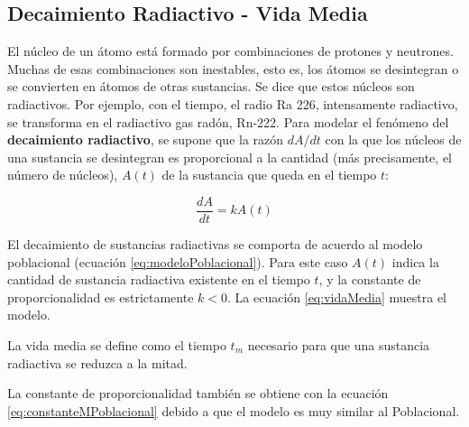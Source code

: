 \subsection{Decaimiento Radiactivo - Vida Media}

El núcleo de un átomo está formado por combinaciones de protones y neutrones. Muchas de esas combinaciones son inestables, esto es, los 
átomos se desintegran o se convierten en átomos de otras sustancias. Se dice que estos núcleos son radiactivos. Por ejemplo, con el tiempo, 
el radio Ra 226, intensamente radiactivo, se transforma en el radiactivo gas radón, Rn-222. Para modelar el fenómeno del \textbf{decaimiento 
radiactivo}, se supone que la razón $dA/dt$ con la que los núcleos de una sustancia se desintegran es proporcional a la cantidad (más precisamente, 
el número de núcleos), $A(t)$ de la sustancia que queda en el tiempo $t$:

\begin{equation}
	\dfrac{dA}{dt} = kA(t)
	\label{eq:vidaMedia}
\end{equation}

El decaimiento de sustancias radiactivas se comporta de acuerdo al modelo poblacional (ecuación \ref{eq:modeloPoblacional}). Para este caso 
$A(t)$ indica la cantidad de sustancia radiactiva existente en el tiempo $t$, y la constante de proporcionalidad es estrictamente $k<0$. 
La ecuación \ref{eq:vidaMedia} muestra el modelo.

La vida media se define como el tiempo $t_m$ necesario para que una sustancia radiactiva se reduzca a la mitad. 

La constante de proporcionalidad también se obtiene con la ecuación \ref{eq:constanteMPoblacional} debido a que el modelo es muy similar al 
Poblacional.

